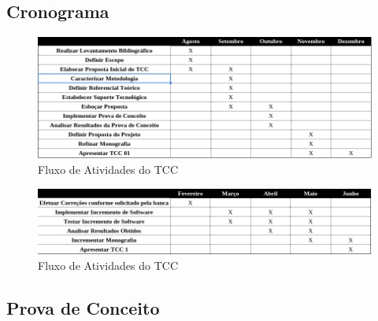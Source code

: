  \subsection{Cronograma}
   \begin{figure}[h]
    \centering
    \includegraphics[width=\textwidth, natwidth= 300, natheight=300]{figuras/cronograma_tcc1.png}
    \caption{Fluxo de Atividades do TCC}
    \label{fig:cronograma_tcc1}
  \end{figure}
  
    \begin{figure}[h]
    \centering
    \includegraphics[width=\textwidth, natwidth= 300, natheight=300]{figuras/cronograma_tcc2.png}
    \caption{Fluxo de Atividades do TCC}
    \label{fig:cronograma_tcc2}
  \end{figure}

 \subsection{Prova de Conceito}

